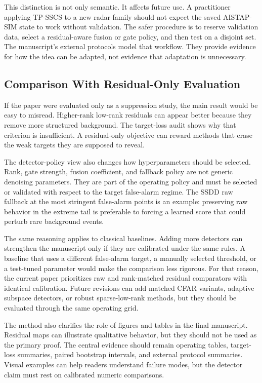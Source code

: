 \documentclass[journal]{IEEEtran}
\begin{document}
This distinction is not only semantic. It affects future use. A practitioner applying TP-SSCS to a new radar family should not expect the saved AISTAP-SIM state to work without validation. The safer procedure is to reserve validation data, select a residual-aware fusion or gate policy, and then test on a disjoint set. The manuscript's external protocols model that workflow. They provide evidence for how the idea can be adapted, not evidence that adaptation is unnecessary.

\subsection{Comparison With Residual-Only Evaluation}

If the paper were evaluated only as a suppression study, the main result would be easy to misread. Higher-rank low-rank residuals can appear better because they remove more structured background. The target-loss audit shows why that criterion is insufficient. A residual-only objective can reward methods that erase the weak targets they are supposed to reveal.

The detector-policy view also changes how hyperparameters should be selected. Rank, gate strength, fusion coefficient, and fallback policy are not generic denoising parameters. They are part of the operating policy and must be selected or validated with respect to the target false-alarm regime. The SSDD raw fallback at the most stringent false-alarm points is an example: preserving raw behavior in the extreme tail is preferable to forcing a learned score that could perturb rare background events.

The same reasoning applies to classical baselines. Adding more detectors can strengthen the manuscript only if they are calibrated under the same rules. A baseline that uses a different false-alarm target, a manually selected threshold, or a test-tuned parameter would make the comparison less rigorous. For that reason, the current paper prioritizes raw and rank-matched residual comparators with identical calibration. Future revisions can add matched CFAR variants, adaptive subspace detectors, or robust sparse-low-rank methods, but they should be evaluated through the same operating grid.

The method also clarifies the role of figures and tables in the final manuscript. Residual maps can illustrate qualitative behavior, but they should not be used as the primary proof. The central evidence should remain operating tables, target-loss summaries, paired bootstrap intervals, and external protocol summaries. Visual examples can help readers understand failure modes, but the detector claim must rest on calibrated numeric comparisons.
\end{document}
